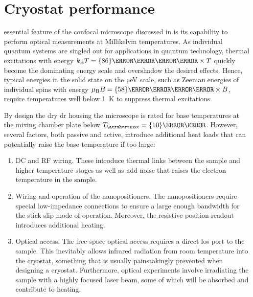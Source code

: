 \chapter{Cryostat performance}\label{ch:setup:cooling}
 essential feature of the confocal microscope discussed in \thethesis is its capability to perform optical measurements at Millikelvin temperatures.
As individual quantum systems are singled out for applications in quantum technology, thermal excitations with energy $\kb T = \qty{86}{\micro\eV\per\kelvin}\times T$ quickly become the dominating energy scale and overshadow the desired effects.
Hence, typical energies in the solid state on the \unit{\micro\eV} scale, such as Zeeman energies of individual spins with energy $\mub B = \qty{58}{\micro\eV\per\tesla}\times B$, require temperatures well below \qty{1}{\kelvin} to suppress thermal excitations.

By design the \odin dry \gls{dr} housing the microscope is rated for base temperatures at the mixing chamber plate below $\Tmxc=\qty{10}{\milli\kelvin}$.
However, several factors, both passive and active, introduce additional heat loads that can potentially raise the base temperature if too large:
\begin{enumerate}
    \item \label{itm:setup:cooling:wiring}
    DC and RF wiring.
    These introduce thermal links between the sample and higher temperature stages as well as add noise that raises the electron temperature in the sample.
    \item \label{itm:setup:cooling:positioners}
    Wiring and operation of the \positioner nanopositioners.
    The nanopositioners require special low-impedance connections to ensure a large enough bandwidth for the stick-slip mode of operation.
    Moreover, the resistive position readout introduces additional heating.
    \item \label{itm:setup:cooling:optical}
    Optical access.
    The free-space optical access requires a direct \gls{los} port to the sample.
    This inevitably allows infrared radiation from room temperature into the cryostat, something that is usually painstakingly prevented when designing a cryostat.
    Furthermore, optical experiments involve irradiating the sample with a highly focused laser beam, some of which will be absorbed and contribute to heating.
\end{enumerate}

